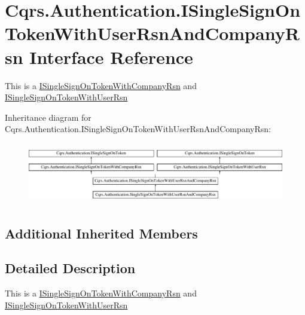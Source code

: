 \hypertarget{interfaceCqrs_1_1Authentication_1_1ISingleSignOnTokenWithUserRsnAndCompanyRsn}{}\section{Cqrs.\+Authentication.\+I\+Single\+Sign\+On\+Token\+With\+User\+Rsn\+And\+Company\+Rsn Interface Reference}
\label{interfaceCqrs_1_1Authentication_1_1ISingleSignOnTokenWithUserRsnAndCompanyRsn}


This is a \hyperlink{interfaceCqrs_1_1Authentication_1_1ISingleSignOnTokenWithCompanyRsn}{I\+Single\+Sign\+On\+Token\+With\+Company\+Rsn} and \hyperlink{interfaceCqrs_1_1Authentication_1_1ISingleSignOnTokenWithUserRsn}{I\+Single\+Sign\+On\+Token\+With\+User\+Rsn}  


Inheritance diagram for Cqrs.\+Authentication.\+I\+Single\+Sign\+On\+Token\+With\+User\+Rsn\+And\+Company\+Rsn\+:\begin{figure}[H]
\begin{center}
\leavevmode
\includegraphics[height=2.692308cm]{interfaceCqrs_1_1Authentication_1_1ISingleSignOnTokenWithUserRsnAndCompanyRsn}
\end{center}
\end{figure}
\subsection*{Additional Inherited Members}


\subsection{Detailed Description}
This is a \hyperlink{interfaceCqrs_1_1Authentication_1_1ISingleSignOnTokenWithCompanyRsn}{I\+Single\+Sign\+On\+Token\+With\+Company\+Rsn} and \hyperlink{interfaceCqrs_1_1Authentication_1_1ISingleSignOnTokenWithUserRsn}{I\+Single\+Sign\+On\+Token\+With\+User\+Rsn} 

